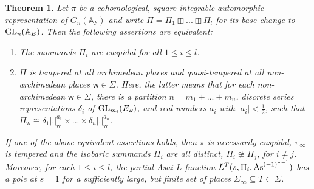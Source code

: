 \documentclass[a4paper,10pt]{amsart}
\newtheorem{thm}[equation]{Theorem}
\theoremstyle{definition}
\numberwithin{equation}{section}
\def\A{\mathbb A}
\def\ww{\mathsf w}
\def\GL{{\rm GL}}
\begin{document}
\begin{thm}\label{thm:qtcusp}
Let $\pi$ be a cohomological, square-integrable automorphic representation of $G_n(\A_F)$ and write $\Pi=\Pi_1\boxplus...\boxplus\Pi_l$ for its base change to $\GL_n(\A_E)$. Then the following assertions are equivalent:
\begin{enumerate}
\item The summands $\Pi_i$ are cuspidal for all $1\leq i\leq l$.
\item $\Pi$ is tempered at all archimedean places and quasi-tempered at all non-archimedean places $\ww\in\Sigma$. Here, the latter means that for each non-archimedean $\ww\in\Sigma$, there is a partition $n=m_1+...+m_u$, discrete series representations $\delta_{i}$ of $\GL_{m_i}(E_\ww)$, and real numbers $a_{i}$ with $|a_{i}|<\tfrac12$, such that $\Pi_\ww\cong\delta_{1} |.|_\ww^{a_{1}}\times...\times\delta_{u} |.|_\ww^{a_{u}}$. 
\end{enumerate}
If one of the above equivalent assertions holds, then $\pi$ is necessarily cuspidal, $\pi_\infty$ is tempered and the isobaric summands $\Pi_i$ are all distinct, $\Pi_i\ncong\Pi_j$, for $i\neq j$. Moreover, for each $1\leq i\leq l$, the partial Asai $L$-function $L^T(s,\Pi_i,{\rm As}^{(-1)^{n-1}})$ has a pole at $s=1$ for a sufficiently large, but finite set of places $\Sigma_\infty\subseteq T\subset \Sigma$.
\end{thm}
\end{document}
